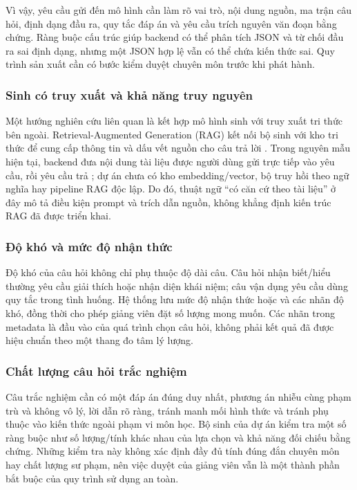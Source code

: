 Vì vậy, yêu cầu gửi đến mô hình cần làm rõ vai trò, nội dung nguồn, ma trận
câu hỏi, định dạng đầu ra, quy tắc đáp án và yêu cầu trích nguyên văn đoạn
bằng chứng. Ràng buộc cấu trúc giúp backend có thể phân tích JSON và từ
chối đầu ra sai định dạng, nhưng một JSON hợp lệ vẫn có thể chứa kiến thức
sai. Quy trình sản xuất cần có bước kiểm duyệt chuyên môn trước khi phát
hành.

\subsubsection{Sinh có truy xuất và khả năng truy nguyên}
Một hướng nghiên cứu liên quan là kết hợp mô hình sinh với truy xuất tri
thức bên ngoài. Retrieval-Augmented Generation (RAG) kết nối bộ sinh với
kho tri thức để cung cấp thông tin và dấu vết nguồn cho câu trả lời
\cite{Lewis2020RAG}. Trong nguyên mẫu hiện tại, backend đưa nội dung tài
liệu được người dùng gửi trực tiếp vào yêu cầu, rồi yêu cầu trả
; dự án chưa có kho embedding/vector, bộ truy hồi theo
ngữ nghĩa hay pipeline RAG độc lập. Do đó, thuật ngữ “có căn cứ theo tài
liệu” ở đây mô tả điều kiện prompt và trích dẫn nguồn, không khẳng định
kiến trúc RAG đã được triển khai.

\subsubsection{Độ khó và mức độ nhận thức}
Độ khó của câu hỏi không chỉ phụ thuộc độ dài câu. Câu hỏi nhận biết/hiểu
thường yêu cầu giải thích hoặc nhận diện khái niệm; câu vận dụng yêu cầu
dùng quy tắc trong tình huống. Hệ thống lưu mức độ nhận thức
 hoặc  và các nhãn độ khó, đồng thời
cho phép giảng viên đặt số lượng mong muốn. Các nhãn trong metadata là đầu
vào của quá trình chọn câu hỏi, không phải kết quả đã được hiệu chuẩn theo
một thang đo tâm lý lượng.

\subsubsection{Chất lượng câu hỏi trắc nghiệm}
Câu trắc nghiệm cần có một đáp án đúng duy nhất, phương án nhiễu cùng phạm
trù và không vô lý, lời dẫn rõ ràng, tránh manh mối hình thức và tránh phụ
thuộc vào kiến thức ngoài phạm vi môn học. Bộ sinh của dự án kiểm tra một
số ràng buộc như số lượng/tính khác nhau của lựa chọn và khả năng đối chiếu
bằng chứng. Những kiểm tra này không xác định đầy đủ tính đúng đắn chuyên
môn hay chất lượng sư phạm, nên việc duyệt của giảng viên vẫn là một thành
phần bắt buộc của quy trình sử dụng an toàn.


